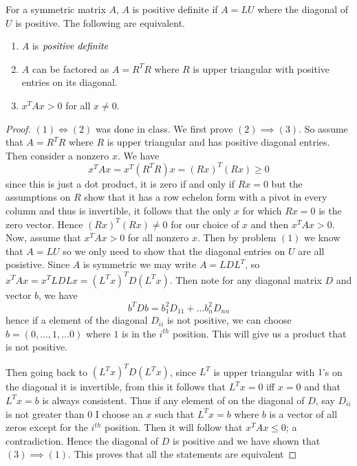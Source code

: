 \newpage
\question
For a symmetric matrix $A$, $A$ is positive definite if $A = LU$ where the diagonal of $U$ is positive. 
The following are equivalent. 
\begin{enumerate}
    \item $A$ is $\emph{positive definite}$
    \item $A$ can be factored as $A = R^TR$ where $R$ is upper triangular with positive entries on its diagonal. 
    \item $x^TAx > 0$ for all $x \neq 0$.
    
\end{enumerate}

\begin{proof}
    $(1) \iff (2)$ was done in class. 
    We first prove $(2) \implies (3)$. So assume that $A = R^TR$ where $R$ is upper triangular and has positive diagonal entries. 
    Then consider a nonzero $x$. We have 
    \[x^TAx = x^T (R^TR) x = (Rx)^T(Rx) \geq 0\]
    since this is just a dot product, it is zero if and only if $Rx = 0$ but the assumptions on $R$ show that it has a row echelon form  with a pivot in every column and 
    thus is invertible, it follows that the only $x$ for which $Rx = 0$ is the zero vector. Hence $(Rx)^T(Rx) \neq 0$ for our choice of $x$ and then 
    $x^TAx > 0$. Now, assume that $x^TAx > 0$ for all nonzero $x$. Then by problem $(1)$ we know that $A = LU$ so we only need to show that the diagonal entries on $U$ are all posistive. 
    Since $A$ is symmetric we may write $A = LDL^T$, so $x^TAx = x^TL D Lx = (L^Tx)^T D (L^Tx)$. Then note for any diagonal matrix $D$ and vector $b$, we have 
    \[b^TDb = b_1^2 D_{11} + \dots b_n^2 D_{nn}\]
    hence if a element of the diagonal $D_{ii} $ is not positive, we can choose $b = (0, \dots, 1, \dots 0)$ where $1$ is in the $i^{th}$ position. This will give us a product that is not positive. 


    Then going back to  $ (L^Tx)^T D (L^Tx)$, since $L^T$ is upper triangular with $1$'s on the diagonal it is invertible, from this it follows that $L^Tx = 0$ iff $x = 0$ and that $L^Tx = b$ is always consistent. Thus if any element of on the diagonal 
    of $D$, say $D_{ii}$ is not greater than 
    $0$ I choose an $x$ such that $L^Tx = b$ where $b$ is a vector of all zeros except for the $i^{th}$ position. Then it will follow that $x^TAx \leq 0$; a contradiction. Hence the diagonal of $D$ is positive 
    and we have shown that $(3) \implies (1)$. This proves that all the statements are equivalent 

\end{proof}


